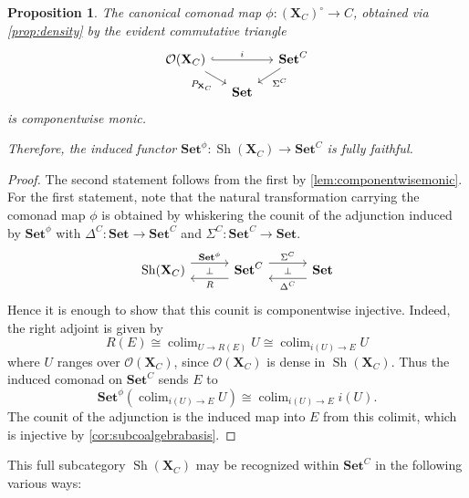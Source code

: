 \documentclass[11pt, oneside, article]{memoir}
\theoremstyle{plain}
\newtheorem{proposition}[theorem]{Proposition}
\theoremstyle{definition}
\theoremstyle{remark}
\DeclareMathOperator{\Sh}{Sh}
\DeclareMathOperator*{\colim}{colim}
\newcommand{\namedcat}[1]{\mathbf{#1}}
\newcommand{\spa}[1]{\mathbf{#1}}
\newcommand{\Set}{\namedcat{Set}}
\newcommand{\CoalgOn}[2]{{#2}^{#1}}
\newcommand{\CoalgSet}[1]{\CoalgOn{#1}{\Set}}
\newcommand{\carr}{\Sigma}
\newcommand{\rcarr}{\Delta}
\newcommand{\car}[1]{\carr^{#1}}
\newcommand{\rcar}[1]{\rcarr^{#1}}
\newcommand{\carC}{\car{\cC}}
\newcommand{\rcarC}{\rcar{\cC}}
\newcommand{\ph}[1]{#1}
\newcommand{\com}[2]{{#1}^{#2}}
\newcommand{\comr}[2]{R}
\newcommand{\topbasis}[1]{\pP_{#1}}
\newcommand{\cmnd}[1]{{#1}}
\newcommand{\eE}{E}
\newcommand{\xU}{U}
\newcommand{\cC}{\cmnd{C}}
\newcommand{\pP}{\ph{P}}
\newcommand{\tX}{\spa{X}}
\newcommand{\CSet}{\CoalgSet{\cC}}
\newcommand{\cmdtotop}[1]{{\tX_{#1}}}
\newcommand{\topreflect}[1]{(\cmdtotop{#1})^\circ}
\newcommand{\opens}[1]{\mathcal{O}(#1)}
\newcommand{\coto}{\to}
\begin{document}
\begin{proposition}\label{prop:sheavesff}
  The canonical comonad map $\phi \colon \topreflect{\cC} \coto \cC$,
  obtained via \cref{prop:density} by the evident commutative triangle
  \[\begin{tikzcd}[sep=small]
      {\opens{\cmdtotop{\cC}}} && \CSet \\
      & \Set
      \arrow[hook, from=1-1, to=1-3, "i"]
      \arrow["\topbasis{\cmdtotop{\cC}}"', from=1-1, to=2-2]
      \arrow["\carC", from=1-3, to=2-2]
    \end{tikzcd}\] is componentwise monic.

  Therefore, the induced functor
  $\com{\Set}{\phi} \colon \Sh(\cmdtotop{\cC}) \to \CSet$ is fully
  faithful.
\end{proposition}
\begin{proof}
  The second statement follows from the first by
  \cref{lem:componentwisemonic}. For the first statement, note that
  the natural transformation carrying the comonad map $\phi$ is
  obtained by whiskering the counit of the adjunction induced by
  $\com{\Set}{\phi}$ with $\rcarC \colon \Set \to \CSet$ and
  $\carC \colon \CSet \to \Set$.
  \[
    \begin{tikzcd}[column sep=30pt]
      \Sh(\cmdtotop{\cC})\ar[r, shift left=6pt, "\com{\Set}{\phi}"]\ar["\bot"{anchor=center},r, draw=none]&
      \CSet\ar[l, shift left=6pt, "\comr{\Set}{\phi}"]\ar[r, shift left=6pt, "\carC"]\ar["\bot"{anchor=center},r, draw=none]& \Set\ar[l, shift left=6pt, "\rcarC"]
    \end{tikzcd}\] Hence it is enough to show that this counit is
  componentwise injective.
  Indeed, the right adjoint is given by
  \[\comr{\Set}{\phi}(\eE) \cong \colim_{U \to \comr{\Set}{\phi}(\eE)} U \cong \colim_{i(U) \to \eE} U\] where $\xU$ ranges over $\opens{\cmdtotop{\cC}}$,
  since $\opens{\cmdtotop{\cC}}$ is dense in
  $\Sh(\cmdtotop{\cC})$. Thus the induced comonad on $\CSet$ sends
  $\eE$ to
  \[\com{\Set}{\phi}\left(\colim_{i(U) \to \eE} U\right) \cong \colim_{i(U) \to \eE} i(U).\]
  The counit of the adjunction is the induced map into $\eE$ from
  this colimit, which is injective by \cref{cor:subcoalgebrabasis}.
\end{proof}

This full subcategory $\Sh(\cmdtotop{\cC})$ may be recognized within
$\CSet$ in the following various ways:
\end{document}
